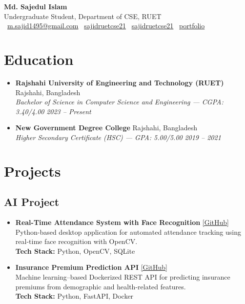 \documentclass[letterpaper,11pt]{article}
\newcommand{\resumeSubheading}[4]{
  \item\small{
    \textbf{#1} \hfill #2 \\
    \textit{\small #3} \hfill \textit{\small #4} \vspace{-5pt}
  }
}
\newcommand{\projectItem}[4]{
  \item \small{
    \textbf{#1} \hfill #4 \\
    #2 \\
    \textbf{Tech Stack:} #3
    \vspace{-3pt}
  }
}
\newcommand{\resumeSubHeadingListStart}{\begin{itemize}[leftmargin=*]}
\newcommand{\resumeSubHeadingListEnd}{\end{itemize}\vspace{-5pt}}
\begin{document}
\begin{center}
    {\LARGE \textbf{Md. Sajedul Islam}} \\[6pt]
    Undergraduate Student, Department of CSE, RUET \\[4pt]

    \faEnvelope\ 
    \href{mailto:m.sajid1495@gmail.com}{m.sajid1495@gmail.com}
    \quad
    \faLinkedin\ 
    \href{https://www.linkedin.com/in/sajidruetcse21/}{sajidruetcse21}
    \quad
    \faGithub\ 
    \href{https://github.com/sajidruetcse21}{sajidruetcse21}
    \quad
    \faGlobe\ 
    \href{https://sajidruetcse21.netlify.app/}{portfolio}

\end{center}

\vspace{-10pt}

\section{Education}
\resumeSubHeadingListStart
  \resumeSubheading
    {Rajshahi University of Engineering and Technology (RUET)}{Rajshahi, Bangladesh}
    {Bachelor of Science in Computer Science and Engineering — CGPA: 3.40/4.00}
    {2023 -- Present}
  \resumeSubheading
    {New Government Degree College}{Rajshahi, Bangladesh}
    {Higher Secondary Certificate (HSC) — GPA: 5.00/5.00}
    {2019 -- 2021}
\resumeSubHeadingListEnd

\section{Projects}

\subsection{AI Project}
\resumeSubHeadingListStart
  \projectItem
    {Real-Time Attendance System with Face Recognition}
    {Python-based desktop application for automated attendance tracking using real-time face recognition with OpenCV.}
    {Python, OpenCV, SQLite}
    {\href{https://github.com/sajidruetcse21/Real-Time-Attendance-SQLite}{[GitHub]}}

  \projectItem
    {Insurance Premium Prediction API}
    {Machine learning–based Dockerized REST API for predicting insurance premiums from demographic and health-related features.}
    {Python, FastAPI, Docker}
    {\href{https://github.com/sajidruetcse21/Insurance-Premium-Predictor}{[GitHub]}}
\resumeSubHeadingListEnd
\end{document}
